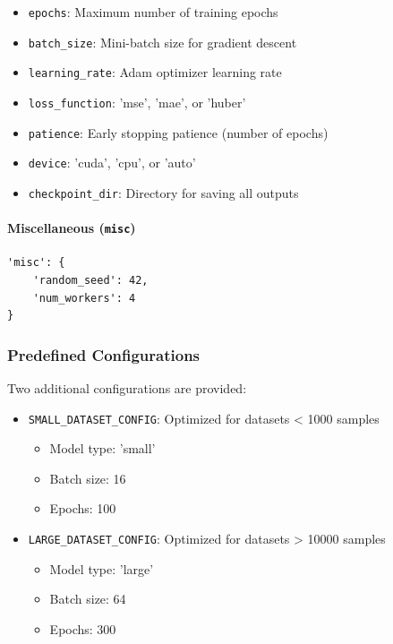 \documentclass[11pt,a4paper]{article}
\begin{document}
\begin{itemize}
    \item \texttt{epochs}: Maximum number of training epochs
    \item \texttt{batch\_size}: Mini-batch size for gradient descent
    \item \texttt{learning\_rate}: Adam optimizer learning rate
    \item \texttt{loss\_function}: 'mse', 'mae', or 'huber'
    \item \texttt{patience}: Early stopping patience (number of epochs)
    \item \texttt{device}: 'cuda', 'cpu', or 'auto'
    \item \texttt{checkpoint\_dir}: Directory for saving all outputs
\end{itemize}

\paragraph{Miscellaneous (\texttt{misc})}

\begin{lstlisting}
'misc': {
    'random_seed': 42,
    'num_workers': 4
}
\end{lstlisting}

\subsubsection{Predefined Configurations}

Two additional configurations are provided:

\begin{itemize}
    \item \texttt{SMALL\_DATASET\_CONFIG}: Optimized for datasets < 1000 samples
    \begin{itemize}
        \item Model type: 'small'
        \item Batch size: 16
        \item Epochs: 100
    \end{itemize}

    \item \texttt{LARGE\_DATASET\_CONFIG}: Optimized for datasets > 10000 samples
    \begin{itemize}
        \item Model type: 'large'
        \item Batch size: 64
        \item Epochs: 300
    \end{itemize}
\end{itemize}
\end{document}
